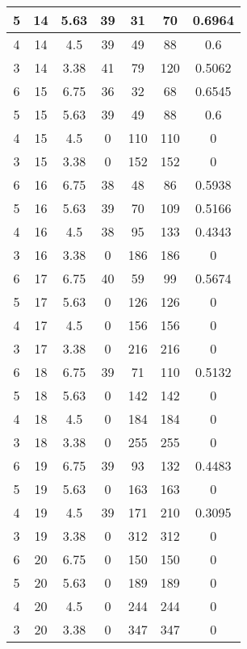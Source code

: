 \documentclass[letterpaper, 12pt]{article}
\begin{document}
\begin{longtable}{|c|c|c|c|c|c|c|}
\hline
5 & 14 & 5.63 & 39 & 31 & 70 & 0.6964 \\
\hline
4 & 14 & 4.5 & 39 & 49 & 88 & 0.6 \\
\hline
3 & 14 & 3.38 & 41 & 79 & 120 & 0.5062 \\
\hline
6 & 15 & 6.75 & 36 & 32 & 68 & 0.6545 \\
\hline
5 & 15 & 5.63 & 39 & 49 & 88 & 0.6 \\
\hline
4 & 15 & 4.5 & 0 & 110 & 110 & 0 \\
\hline
3 & 15 & 3.38 & 0 & 152 & 152 & 0 \\
\hline
6 & 16 & 6.75 & 38 & 48 & 86 & 0.5938 \\
\hline
5 & 16 & 5.63 & 39 & 70 & 109 & 0.5166 \\
\hline
4 & 16 & 4.5 & 38 & 95 & 133 & 0.4343 \\
\hline
3 & 16 & 3.38 & 0 & 186 & 186 & 0 \\
\hline
6 & 17 & 6.75 & 40 & 59 & 99 & 0.5674 \\
\hline
5 & 17 & 5.63 & 0 & 126 & 126 & 0 \\
\hline
4 & 17 & 4.5 & 0 & 156 & 156 & 0 \\
\hline
3 & 17 & 3.38 & 0 & 216 & 216 & 0 \\
\hline
6 & 18 & 6.75 & 39 & 71 & 110 & 0.5132 \\
\hline
5 & 18 & 5.63 & 0 & 142 & 142 & 0 \\
\hline
4 & 18 & 4.5 & 0 & 184 & 184 & 0 \\
\hline
3 & 18 & 3.38 & 0 & 255 & 255 & 0 \\
\hline
6 & 19 & 6.75 & 39 & 93 & 132 & 0.4483 \\
\hline
5 & 19 & 5.63 & 0 & 163 & 163 & 0 \\
\hline
4 & 19 & 4.5 & 39 & 171 & 210 & 0.3095 \\
\hline
3 & 19 & 3.38 & 0 & 312 & 312 & 0 \\
\hline
6 & 20 & 6.75 & 0 & 150 & 150 & 0 \\
\hline
5 & 20 & 5.63 & 0 & 189 & 189 & 0 \\
\hline
4 & 20 & 4.5 & 0 & 244 & 244 & 0 \\
\hline
3 & 20 & 3.38 & 0 & 347 & 347 & 0 \\
\hline
\end{longtable}
\end{document}
